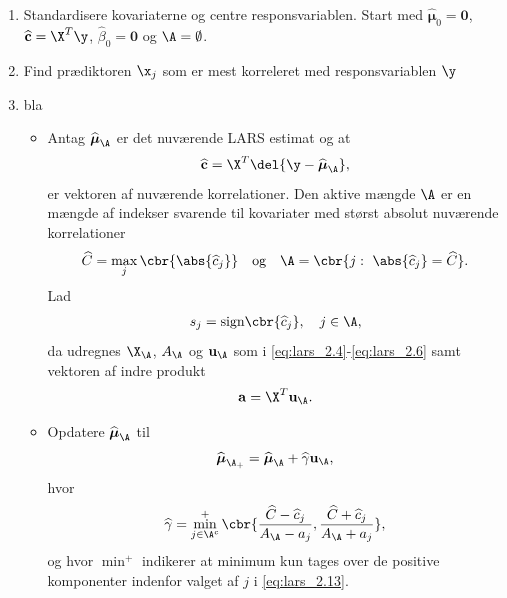 \begin{alg} 
\begin{enumerate}
\item Standardisere kovariaterne og centre responsvariablen. 
Start med \(\widehat{\boldsymbol{\mu}}_0 = \mathbf{0}\), \(\widehat{\mathbf{c}} = \X^T \y\), \(\widehat{\beta}_0 = \mathbf{0}\) og \(\A = \emptyset\).
\item Find prædiktoren \(\x_j\) som er mest korreleret med responsvariablen \(\y\)
\item bla
\begin{itemize}
\item Antag \(\widehat{\boldsymbol{\mu}}_\A\) er det nuværende LARS estimat og at
\begin{align}
\widehat{\mathbf{c}} = \X^T \del{\y - \widehat{\boldsymbol{\mu}}_\A}, \label{eq:lars_2.8}
\end{align} 
er vektoren af nuværende korrelationer.
Den aktive mængde \(\A\) er en mængde af indekser svarende til kovariater med størst absolut nuværende korrelationer
\begin{align}
\widehat{C} = \max_j \cbr{\abs{\widehat{c}_j}} \quad \text{og} \quad \A= \cbr{j: \ \abs{ \widehat{c}_j} = \widehat{C}}. \label{eq:lars_2.9}
\end{align}
Lad 
\begin{align*}
s_j = \text{sign} \cbr{\widehat{c}_j}, \quad j \in \A,
\end{align*}
da udregnes \(\X_\A\), \(A_\A\) og \(\mathbf{u}_\A\) som i \eqref{eq:lars_2.4}-\eqref{eq:lars_2.6}  samt vektoren af indre produkt
\begin{align*}
\mathbf{a} = \X^T \mathbf{u}_\A.
\end{align*}
\item Opdatere \(\widehat{\boldsymbol{\mu}}_\A\) til
\begin{align}
\widehat{\boldsymbol{\mu}}_{\A_+} = \widehat{\boldsymbol{\mu}}_\A + \widehat{\gamma} \mathbf{u}_\A, \label{eq:lars_2.12}
\end{align}
hvor 
\begin{align}
\widehat{\gamma} = \min_{j \in \A^c}^+ \cbr{ \frac{\widehat{C}- \widehat{c}_j}{A_\A - a_j} , \frac{\widehat{C} + \widehat{c}_j}{A_\A + a_j}}, \label{eq:lars_2.13}
\end{align}
og hvor \(\min^+\) indikerer at minimum kun tages over de positive komponenter indenfor valget af \(j\) i \eqref{eq:lars_2.13}.
\end{itemize}
\end{enumerate}
\end{alg}
